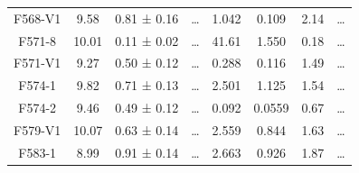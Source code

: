 \documentclass[reprint,%
 amsmath,amssymb,
 aps,
]{revtex4-1}
\begin{document}
\begin{longtable*}{|c|c|c|c|c|c|c|c| }
F568-V1              & 9.58                      & 0.81 ± 0.16           & …                      & 1.042                                                        & 0.109                                                         & 2.14                                                           & …                                                             \\
F571-8               & 10.01                     & 0.11 ± 0.02           & …                      & 41.61                                                        & 1.550                                                        & 0.18                                                          & …                                                             \\
F571-V1              & 9.27                      & 0.50 ± 0.12           & …                      & 0.288                                                        & 0.116                                                          & 1.49                                                         & …                                                             \\
F574-1               & 9.82                      & 0.71 ± 0.13           & …                      & 2.501                                                        & 1.125                                                           & 1.54                                                           & …                                                             \\
F574-2               & 9.46                      & 0.49 ± 0.12           & …                      & 0.092                                                        & 0.0559                                                         & 0.67                                                          & …                                                             \\
F579-V1              & 10.07                     & 0.63 ± 0.14           & …                      & 2.559                                                        & 0.844                                                         & 1.63                                                           & …                                                             \\
F583-1               & 8.99                      & 0.91 ± 0.14           & …                      & 2.663                                                        & 0.926                                                          & 1.87                                                            & …                                                             \\

\end{longtable*}
\end{document}
